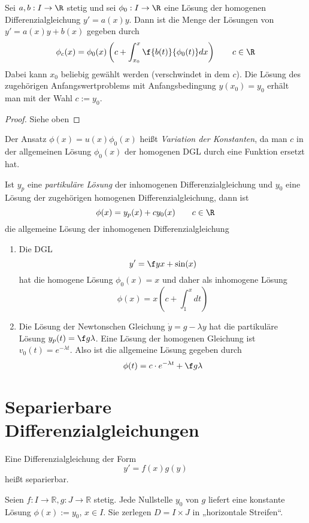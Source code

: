 \documentclass[a4paper,10pt]{scrbook}
\begin{document}
\begin{st}
	Sei $a,b:I \to \R$ stetig und sei $\phi_0 : I \to \R$ eine Lösung der homogenen Differenzialgleichung $y' = a(x) y$.
	Dann ist die Menge der Lösungen von $y' = a(x)y + b(x)$ gegeben durch
	\[
		\phi_c (x) = \phi_0(x) \left(c + \int_{x_0}^x \f {b(t)}{\phi_0(t)} dx\right) \qquad c\in \R
	\]
	Dabei kann $x_0$ beliebig gewählt werden (verschwindet in dem $c$).
	Die Lösung des zugehörigen Anfangswertproblems mit Anfangsbedingung $y(x_0) = y_0$ erhält man mit der Wahl $c := y_0$.
	\begin{proof}
		Siehe oben \fixme[unvollständig]
	\end{proof}
	\begin{note}
		Der Ansatz $\phi(x) = u(x) \phi_0(x)$ heißt \emph{Variation der Konstanten}, da man $c$ in der allgemeinen Lösung $\phi_0(x)$ der homogenen DGL durch eine Funktion ersetzt hat.

		Ist $y_p$ eine \emph{partikuläre Lösung} der inhomogenen Differenzialgleichung und $y_0$ eine Lösung der zugehörigen homogenen Differenzialgleichung, dann ist
		\[
			\phi(x) = y_p(x) + cy_0(x) \qquad c\in \R
		\]
		die allgemeine Lösung der inhomogenen Differenzialgleichung
	\end{note}
\end{st}

\begin{ex*}
	\begin{enumerate}[1)]
		\item
			Die DGL
			\[
				y' = \f yx + \sin(x)
			\]
			hat die homogene Lösung $\phi_0(x) = x$ und daher als inhomogene Lösung
			\[
				\phi(x) = x(c + \int_1^x dt)
			\]
		\item	
			Die Lösung der Newtonschen Gleichung $\dot y = g - \lambda y$ hat die partikuläre Lösung $y_p(t) = \f g\lambda$.
			Eine Lösung der homogenen Gleichung ist $v_0(t) = e^{-\lambda t}$.
			Also ist die allgemeine Lösung gegeben durch
			\[
				\phi(t) = c\cdot e^{-\lambda t} + \f g\lambda
			\]
	\end{enumerate}
\end{ex*}



\section{Separierbare Differenzialgleichungen}
Eine Differenzialgleichung der Form 
\[
y'=f(x)g(y)
\]
heißt separierbar.

Seien $f:I\to \mathbb R, g: J\to \mathbb{R}$ stetig.
Jede Nullstelle $y_0$ von $g$ liefert eine konstante Lösung $\phi(x):=y_0$, $x\in I$.
Sie zerlegen $D=I\times J$ in „horizontale Streifen“.
\end{document}
